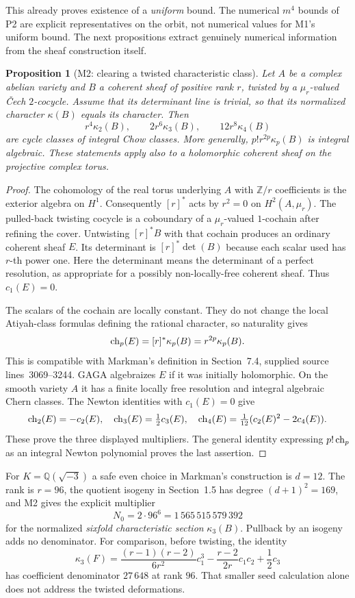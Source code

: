\documentclass[11pt,a4paper]{article}
\newtheorem{proposition}[theorem]{Proposition}
\theoremstyle{definition}\newtheorem{definition}[theorem]{Definition}
\theoremstyle{remark}\newtheorem{remark}[theorem]{Remark}
\newcommand{\Q}{\mathbb Q}\newcommand{\Z}{\mathbb Z}\newcommand{\C}{\mathbb C}\newcommand{\R}{\mathbb R}
\begin{document}
This already proves existence of a \emph{uniform} bound. The numerical $m^4$ bounds of P2 are explicit representatives on the orbit, not numerical values for M1's uniform bound. The next propositions extract genuinely numerical information from the sheaf construction itself.

\begin{proposition}[M2: clearing a twisted characteristic class]\label{M2}
Let $A$ be a complex abelian variety and $B$ a coherent sheaf of positive rank $r$, twisted by a $\mu_r$-valued \v Cech $2$-cocycle. Assume that its determinant line is trivial, so that its normalized character $\kappa(B)$ equals its character. Then
\[
 r^4\kappa_2(B),\qquad 2r^6\kappa_3(B),\qquad
 12r^8\kappa_4(B)
\]
are cycle classes of integral Chow classes. More generally, $p!r^{2p}\kappa_p(B)$ is integral algebraic. These statements apply also to a holomorphic coherent sheaf on the projective complex torus.
\end{proposition}
\begin{proof}
The cohomology of the real torus underlying $A$ with $\Z/r$ coefficients is the exterior algebra on $H^1$. Consequently $[r]^*$ acts by $r^2=0$ on $H^2(A,\mu_r)$. The pulled-back twisting cocycle is a coboundary of a $\mu_r$-valued $1$-cochain after refining the cover. Untwisting $[r]^*B$ with that cochain produces an ordinary coherent sheaf $E$. Its determinant is $[r]^*\det(B)$ because each scalar used has $r$-th power one. Here the determinant means the determinant of a perfect resolution, as appropriate for a possibly non-locally-free coherent sheaf. Thus $c_1(E)=0$.

The scalars of the cochain are locally constant. They do not change the local Atiyah-class formulas defining the rational character, so naturality gives
\[
 \operatorname{ch}_p(E)=[r]^*\kappa_p(B)=r^{2p}\kappa_p(B).
\]
This is compatible with Markman's definition in Section~7.4, supplied source lines~3069--3244. GAGA algebraizes $E$ if it was initially holomorphic. On the smooth variety $A$ it has a finite locally free resolution and integral algebraic Chern classes. The Newton identities with $c_1(E)=0$ give
\[
 \operatorname{ch}_2(E)=-c_2(E),\quad \operatorname{ch}_3(E)=\tfrac12c_3(E),\quad
 \operatorname{ch}_4(E)=\tfrac1{12}(c_2(E)^2-2c_4(E)).
\]
These prove the three displayed multipliers. The general identity expressing $p!\operatorname{ch}_p$ as an integral Newton polynomial proves the last assertion.
\end{proof}

For $K=\Q(\sqrt{-3})$ a safe even choice in Markman's construction is $d=12$. The rank is $r=96$, the quotient isogeny in Section~1.5 has degree $(d+1)^2=169$, and M2 gives the explicit multiplier
\begin{equation}\label{eq:markmanN}
 N_0=2\cdot96^6=1\,565\,515\,579\,392
\end{equation}
for the normalized \emph{sixfold characteristic section} $\kappa_3(B)$. Pullback by an isogeny adds no denominator. For comparison, before twisting, the identity
\[
 \kappa_3(F)=\frac{(r-1)(r-2)}{6r^2}c_1^3
 -\frac{r-2}{2r}c_1c_2+\frac12c_3
\]
has coefficient denominator $27\,648$ at rank $96$. That smaller seed calculation alone does not address the twisted deformations.
\end{document}
